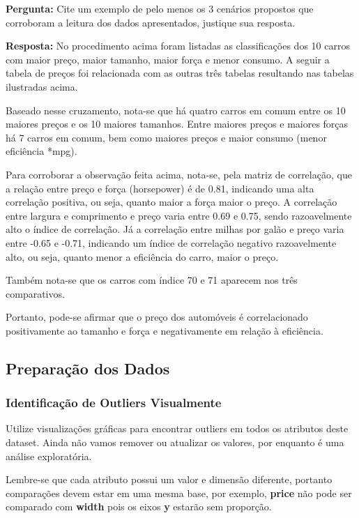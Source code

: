 \documentclass[11pt]{article}
\begin{document}
    \textbf{Pergunta:} Cite um exemplo de pelo menos os 3 cenários propostos
que corroboram a leitura dos dados apresentados, justique sua resposta.

    \textbf{Resposta:} No procedimento acima foram listadas as
classificações dos 10 carros com maior preço, maior tamanho, maior força
e menor consumo. A seguir a tabela de preços foi relacionada com as
outras três tabelas resultando nas tabelas ilustradas acima.

Baseado nesse cruzamento, nota-se que há quatro carros em comum entre os
10 maiores preços e os 10 maiores tamanhos. Entre maiores preços e
maiores forças há 7 carros em comum, bem como maiores preços e maior
consumo (menor eficiência *mpg).

Para corroborar a observação feita acima, nota-se, pela matriz de
correlação, que a relação entre preço e força (horsepower) é de 0.81,
indicando uma alta correlação positiva, ou seja, quanto maior a força
maior o preço. A correlação entre largura e comprimento e preço varia
entre 0.69 e 0.75, sendo razoavelmente alto o índice de correlação. Já a
correlação entre milhas por galão e preço varia entre -0.65 e -0.71,
indicando um índice de correlação negativo razoavelmente alto, ou seja,
quanto menor a eficiência do carro, maior o preço.

Também nota-se que os carros com índice 70 e 71 aparecem nos três
comparativos.

Portanto, pode-se afirmar que o preço dos automóveis é correlacionado
positivamente ao tamanho e força e negativamente em relação à
eficiência.

    \subsection{Preparação dos Dados}\label{preparauxe7uxe3o-dos-dados}

    \subsubsection{Identificação de Outliers
Visualmente}\label{identificauxe7uxe3o-de-outliers-visualmente}

    Utilize visualizações gráficas para encontrar outliers em todos os
atributos deste dataset. Ainda não vamos remover ou atualizar os
valores, por enquanto é uma análise exploratória.

Lembre-se que cada atributo possui um valor e dimensão diferente,
portanto comparações devem estar em uma mesma base, por exemplo,
\textbf{price} não pode ser comparado com \textbf{width} pois os eixos
\textbf{y} estarão sem proporção.
\end{document}
